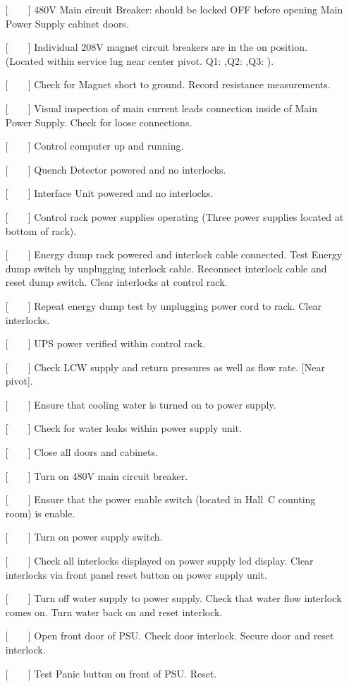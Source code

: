 {\begin{itemize}
\item[{[~~~~]}]{480V Main circuit Breaker:  should be locked OFF
before opening Main Power Supply cabinet doors.}
\item[{[~~~~]}]{Individual 208V magnet circuit breakers are in the on
position.  (Located within service lug near center pivot.
Q1:\hskip0.3in ,Q2:\hskip0.3in ,Q3:\hskip0.3in ).}
\item[{[~~~~]}]{Check for Magnet short to ground. Record resistance measurements.}
\item[{[~~~~]}]{Visual inspection of main current leads connection inside of
Main Power Supply. Check for loose connections.}
\item[{[~~~~]}]{Control computer up and running.}
\item[{[~~~~]}]{Quench Detector powered and no interlocks.}
\item[{[~~~~]}]{Interface Unit powered and no interlocks.}
\item[{[~~~~]}]{Control rack power supplies operating  (Three power supplies
located at bottom of rack).}
\item[{[~~~~]}]{Energy dump rack powered and interlock cable connected. Test
Energy dump switch by unplugging interlock cable. Reconnect interlock cable
and reset dump switch. Clear interlocks at control rack.}
\item[{[~~~~]}]{Repeat energy dump test by unplugging power cord to rack.
Clear interlocks.}
\item[{[~~~~]}]{UPS power verified within control rack.}
\item[{[~~~~]}]{Check LCW supply and return pressures as well as flow rate.
[Near pivot].}
\item[{[~~~~]}]{Ensure that cooling water is turned on to power supply.}
\item[{[~~~~]}]{Check for water leaks within power supply unit.}
\item[{[~~~~]}]{Close all doors and cabinets.}
\item[{[~~~~]}]{Turn on 480V main circuit breaker.}
\item[{[~~~~]}]{Ensure that the power enable switch (located in Hall~C
counting room) is enable.}
\item[{[~~~~]}]{Turn on power supply switch.}
\item[{[~~~~]}]{Check all interlocks displayed on power supply led display.
Clear interlocks via front panel reset button on power supply unit.}
\item[{[~~~~]}]{Turn off water supply to power supply. Check that water
flow interlock comes on. Turn water back on and reset interlock.}
\item[{[~~~~]}]{Open front door of PSU. Check door interlock. Secure door and
reset interlock.}
\item[{[~~~~]}]{Test Panic button on front of PSU. Reset.}
\end{itemize}

}
